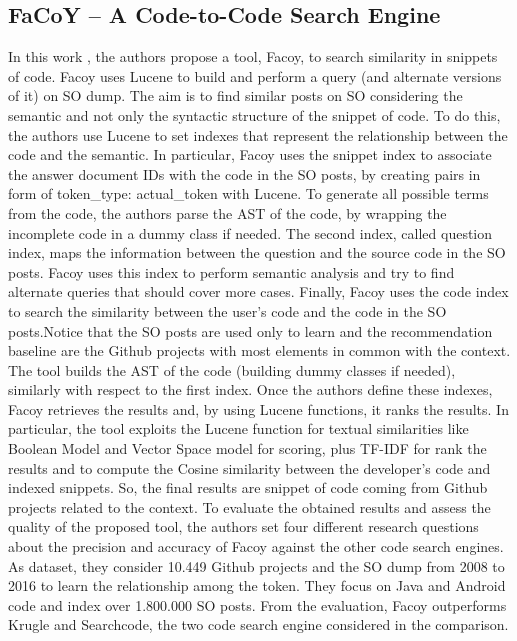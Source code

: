 \subsection{FaCoY – A Code-to-Code Search Engine}
In this work \cite{DBLP:conf/icse/KimKBC0KT18}, the authors propose a tool, Facoy,  to search similarity in snippets of code. Facoy uses Lucene to build and perform a query (and alternate versions of it) on SO dump. The aim is to find similar posts on SO considering the semantic and not only the syntactic structure of the snippet of code.  To do this,  the authors use Lucene to set indexes that represent the relationship between the code and the semantic. In particular, Facoy uses the snippet index to associate the answer document IDs with the code in the SO posts, by creating pairs in form of token\_type: actual\_token with Lucene. To generate all possible terms from the code, the authors parse the AST of the code, by wrapping the incomplete code in a dummy class if needed. The second index, called question index, maps the information between the question and the source code in the SO posts. Facoy uses this index to perform semantic analysis and try to find alternate queries that should cover more cases. Finally, Facoy uses the code index to search the similarity between the user's code and the code in the SO posts.Notice that the SO posts are used only to learn and the recommendation baseline are the Github projects with most elements in common with the context. The tool builds the AST of the code (building dummy classes if needed), similarly with respect to the first index. Once the authors define these indexes, Facoy retrieves the results and, by using Lucene functions, it ranks the results. In particular, the tool exploits the Lucene function for textual similarities like Boolean Model and Vector Space model for scoring, plus TF-IDF for rank the results and to compute the Cosine similarity between the developer's code and indexed snippets. So, the final results are snippet of code coming from Github projects related to the context. To evaluate the obtained results and assess the quality of the proposed tool, the authors set four different research questions about the precision and accuracy of Facoy against the other code search engines. As dataset, they consider 10.449 Github projects and the SO dump from 2008 to 2016 to learn the relationship among the token. They focus on Java and Android code and index over 1.800.000 SO posts. From the evaluation, Facoy outperforms Krugle and Searchcode, the two code search engine considered in the comparison. 

